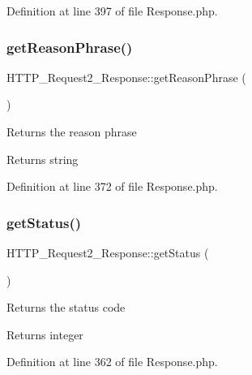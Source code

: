 Definition at line 397 of file Response.\+php.

\hypertarget{classHTTP__Request2__Response_aabc673a3430ee9b8ad0e29275b31c655}{}\label{classHTTP__Request2__Response_aabc673a3430ee9b8ad0e29275b31c655} 
\subsubsection{\texorpdfstring{get\+Reason\+Phrase()}{getReasonPhrase()}}
{\footnotesize\ttfamily H\+T\+T\+P\+\_\+\+Request2\+\_\+\+Response\+::get\+Reason\+Phrase (\begin{DoxyParamCaption}{ }\end{DoxyParamCaption})}

Returns the reason phrase

\begin{DoxyReturn}{Returns}
string 
\end{DoxyReturn}


Definition at line 372 of file Response.\+php.

\hypertarget{classHTTP__Request2__Response_a624920600f1cff1d72493c74e945ace3}{}\label{classHTTP__Request2__Response_a624920600f1cff1d72493c74e945ace3} 
\subsubsection{\texorpdfstring{get\+Status()}{getStatus()}}
{\footnotesize\ttfamily H\+T\+T\+P\+\_\+\+Request2\+\_\+\+Response\+::get\+Status (\begin{DoxyParamCaption}{ }\end{DoxyParamCaption})}

Returns the status code

\begin{DoxyReturn}{Returns}
integer 
\end{DoxyReturn}


Definition at line 362 of file Response.\+php.

\hypertarget{classHTTP__Request2__Response_acf2961ff04baa2610df8ca30ea5313b0}{}\label{classHTTP__Request2__Response_acf2961ff04baa2610df8ca30ea5313b0} 

